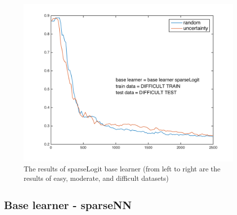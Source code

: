 \documentclass{article}
\begin{document}
\begin{figure}[h]
\begin{minipage}{.31\textwidth}
    \end{minipage}
    \hfill
    \centering
    \begin{minipage}{.31\textwidth}
      \centering
      \includegraphics[width=1\linewidth]{../sparseLogit_difficult}
    \end{minipage}
    \caption{The results of sparseLogit base learner (from left to right are the results of easy, moderate, and difficult datasets)}
    \label{fig:sparseLogit}
  \end{figure}

\subsection{Base learner - sparseNN}
\end{document}
